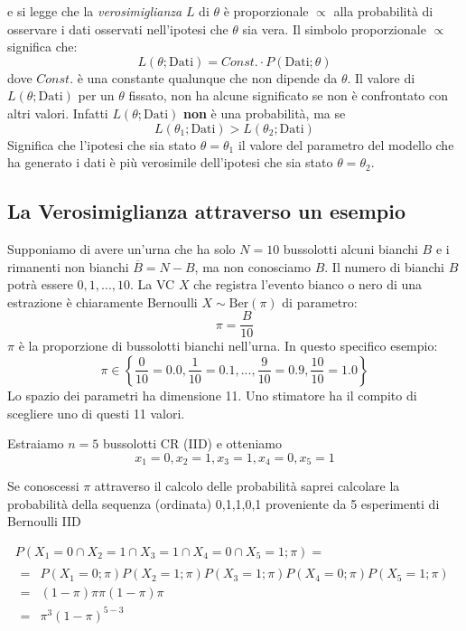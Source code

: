 \documentclass[
  11pt,
]{book}
\theoremstyle{mytheoremstyle}
\theoremstyle{mydefstyle}
\begin{document}
e si legge che la \emph{verosimiglianza} \(L\) di \(\theta\) è proporzionale \(\propto\) alla
probabilità di osservare i dati osservati nell'ipotesi che \(\theta\) sia vera.
Il simbolo proporzionale \(\propto\) significa che:
\[
L(\theta;\text{Dati})=Const.\cdot P(\text{Dati};\theta)
\]
dove \(Const.\) è una constante qualunque che non dipende da \(\theta\).
Il valore di \(L(\theta;\text{Dati})\) per un \(\theta\) fissato, non ha alcune significato
se non è confrontato con altri valori. Infatti \(L(\theta;\text{Dati})\) \textbf{non} è una
probabilità, ma se
\[
L(\theta_1;\text{Dati})> L(\theta_2;\text{Dati})
\]
Significa che l'ipotesi che sia stato \(\theta=\theta_1\) il valore del parametro del
modello che ha generato i dati è più verosimile dell'ipotesi che sia
stato \(\theta=\theta_2\).

\subsection{La Verosimiglianza attraverso un esempio}\label{la-verosimiglianza-attraverso-un-esempio}

Supponiamo di avere un'urna che ha solo \(N=10\) bussolotti alcuni bianchi \(B\) e i rimanenti non bianchi \(\overline{B}=N-B\), ma non conosciamo \(B\).
Il numero di bianchi \(B\) potrà essere \(0, 1,...,10\).
La VC \(X\) che registra l'evento bianco o nero di una estrazione è chiaramente Bernoulli \(X\sim\text{Ber}(\pi)\) di parametro:
\[\pi=\frac B {10}\]
\(\pi\) è la proporzione di bussolotti bianchi nell'urna.
In questo specifico esempio:
\[\pi\in\left\{\frac 0{10}=0.0,\frac{1}{10}=0.1,...,\frac 9 {10}=0.9,\frac{10}{10}=1.0\right\}\]
Lo spazio dei parametri ha dimensione 11.
Uno stimatore ha il compito di scegliere uno di questi 11 valori.

Estraiamo \(n=5\) bussolotti CR (IID) e otteniamo
\[x_1=0,x_2=1,x_3=1,x_4=0,x_5=1\]

Se conoscessi \(\pi\) attraverso il calcolo delle probabilità saprei calcolare la
probabilità della sequenza (ordinata) 0,1,1,0,1 proveniente da 5 esperimenti di
Bernoulli IID

\begin{multline*}
P(X_1=0\cap X_2=1 \cap X_3=1 \cap X_4=0\cap X_5=1;\pi) = \\
\begin{array}{ll}
  = &P(X_1=0;\pi)P(X_2=1;\pi)P(X_3=1;\pi)P(X_4=0;\pi)P(X_5=1;\pi)\\
  = &(1-\pi)\pi\pi(1-\pi)\pi\\
  = &\pi^3(1-\pi)^{5-3}
\end{array}
\end{multline*}
\end{document}

